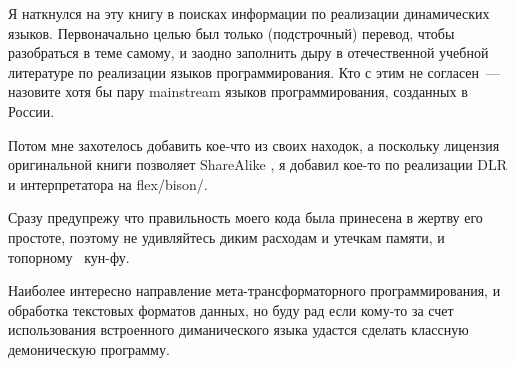 \secdown{}

Я наткнулся на эту книгу в поисках информации по реализации динамических языков.
Первоначально целью был только (подстрочный) перевод, чтобы разобраться в теме
самому, и заодно заполнить дыру в отечественной учебной литературе по реализации
языков программирования. Кто с этим не согласен\ --- назовите хотя бы пару
mainstream  языков программирования, созданных в России.

Потом мне захотелось добавить кое-что из своих находок, а поскольку лицензия
оригинальной книги
позволяет ShareAlike , я добавил кое-то по реализации
DLR и интерпретатора на flex/bison/\cpp.

Сразу предупрежу что правильность моего кода была принесена в жертву его
простоте, поэтому не удивляйтесь диким расходам и утечкам памяти, и топорному
\cpp\ кун-фу.

Наиболее интересно направление мета-трансформаторного программирования, и
обработка текстовых форматов данных, но буду рад если кому-то за счет
использования встроенного диманического языка удастся сделать классную
демоническую программу.

\secup
